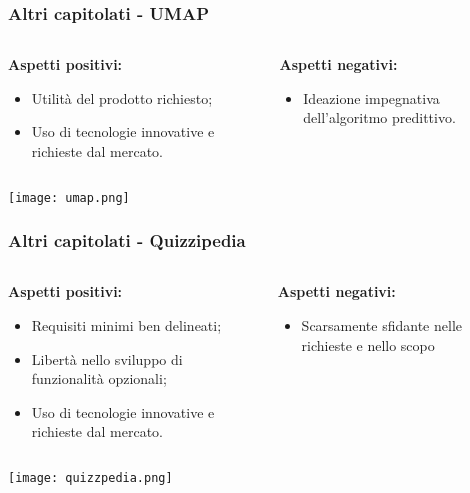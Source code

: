 \begin{frame}
  \frametitle{Altri capitolati - UMAP}
  \begin{columns}
    \begin{column}{0.4\textwidth}
      \par{\textbf{Aspetti positivi:}}
      \begin{itemize}
      \item Utilità del prodotto richiesto;
      \item Uso di tecnologie innovative e richieste dal mercato.
      \end{itemize}
    \end{column}
    \begin{column}{0.4\textwidth}
      \par{\textbf{Aspetti negativi:}}
      \begin{itemize}
      \item Ideazione impegnativa dell'algoritmo predittivo.
      \end{itemize}
    \end{column}
  \end{columns}
  \centering
  \texttt{[image: umap.png]}
\end{frame}

\begin{frame}
  \frametitle{Altri capitolati - Quizzipedia}
  \begin{columns}
    \begin{column}{0.4\textwidth}
      \par{\textbf{Aspetti positivi:}}
      \begin{itemize}
      \item Requisiti minimi ben delineati;
      \item Libertà nello sviluppo di funzionalità opzionali;
      \item Uso di tecnologie innovative e richieste dal mercato.
      \end{itemize}
    \end{column}
    \begin{column}{0.4\textwidth}
      \par{\textbf{Aspetti negativi:}}
      \begin{itemize}
      \item Scarsamente sfidante nelle richieste e nello scopo
      \end{itemize}
    \end{column}
  \end{columns}
  \centering
  \texttt{[image: quizzpedia.png]}
\end{frame}

